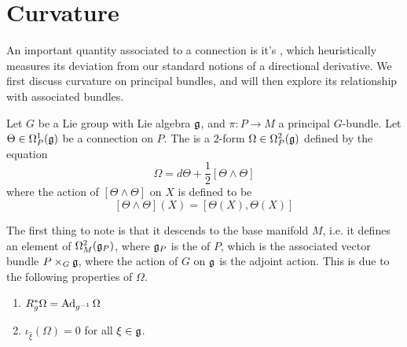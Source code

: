 %
\section{Curvature}
%
An important quantity associated to a connection is it's , which
heuristically measures its deviation from our standard notions of a directional
derivative. We first discuss curvature on principal bundles, and will then
explore its relationship with associated bundles.
%
\begin{defn}
Let $G$ be a Lie group with Lie algebra $\mathfrak{g}$, and $\pi : P \to M$ a principal $G$-bundle.
Let $\Theta \in \Omega_P^1(\mathfrak{g})$ be a connection on $P$. The  is
a $2$-form $\Omega \in \Omega_P^2(\mathfrak{g})$ defined by the equation
\[
\Omega = d\Theta + \frac{1}{2}[\Theta \wedge \Theta]
\]
where the action of $[\Theta \wedge \Theta]$ on $X$ is defined to be
\[
[\Theta \wedge \Theta](X) = [\Theta(X), \Theta(X)]
\]
\end{defn}
%
The first thing to note is that it descends to the base manifold $M$, i.e. it defines
an element of $\Omega_M^2(\mathfrak{g}_P)$, where $\mathfrak{g}_P$ is the  of $P$,
which is the associated vector bundle $P \times_G \mathfrak{g}$, where the action of $G$ on
$\mathfrak{g}$ is the adjoint action. This is due to the following properties of $\Omega$.
%
\begin{prop} \enumbreak
\begin{enumerate}
  \item $R_g^*\Omega = \operatorname{Ad}_{g^{-1}}\Omega$
  \item $\iota_{\widehat{\xi}}(\Omega) = 0$ for all $\xi \in \mathfrak{g}$.
\end{enumerate}
\end{prop}
%
